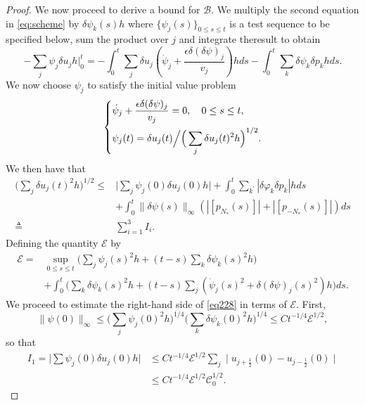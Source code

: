 \documentclass[10pt,a4paper]{amsart}
\begin{document}
\begin{proof}
We now proceed to derive a bound for $\mathscr{B}$. 
We multiply the second equation in \eqref{eq:scheme} by \(\delta\psi_{k}(s)h\)  where \(\{\psi_{j}(s)\}_{0\leq s\leq t}\) is a test sequence to be specified below, sum the product over \(j\) and integrate theresult to obtain
\[-\sum_{j}\psi_{j}\delta u_{j}h\Big|_{0}^t=-\int_{0}^{t}\sum_{j}\delta u_{j}\left(\dot{\psi}_{j}+\frac{\epsilon\delta(\delta\psi)_{j}}{v_{j}}\right)hds-\int_{0}^{t}\sum_{k}\delta\psi_{k}\delta p_{k}hds.\]
We now choose \(\psi_{j}\) to satisfy the initial value problem
\begin{equation}\label{back-para}
  \left\{\begin{aligned}
  \displaystyle  &\dot{\psi}_{j}+\frac{\epsilon\delta(\delta\psi)_{j}}{v_{j}}=0,\quad0\leq s\leq t,\\&\psi_{j}(t)=\delta u_{j}(t)\Big/\Big(\sum_{j}\delta u_{j}(t)^{2}h\Big)^{1/2}.
  \end{aligned}  \right.
\end{equation}
We then have that
\begin{equation}\label{eq228}
 \begin{aligned}
\Big(\sum_{j}\delta u_{j}(t)^{2}h\Big)^{1/2}\leq & \Big|\sum_{j}\psi_{j}(0)\delta u_{j}(0)h\Big|+\int_{0}^{t}\sum_{k^{\prime}}|\delta\varphi_{k}\delta p_{k}|hds \\&+\int_{0}^{t}\|\delta\psi(s)\|_{\infty}(|[p_{N_* }(s)]|+|[p_{- N_* }(s)]|)ds\\\triangleq &\sum_{i=1}^3I_i.
\end{aligned} 
\end{equation}
Defining the quantity $\mathscr{E}$ by
\[\begin{aligned}\label{eq229}
\mathscr{E}=& \sup_{0\leq s\leq t}\Big(\sum_{j}\psi_{j}(s)^{2}h+(t-s)\sum_{k}\delta\psi_{k}(s)^{2}h\Big)  \\
&+\int_{0}^{t}\Big(\sum\limits_{k}\delta\psi_{k}(s)^{2}h+(t-s)\sum_{j}(\dot{\psi}_{j}(s)^{2}+\delta(\delta\psi)_{j}(s)^{2})h\Big)ds.
\end{aligned}\]
We proceed to estimate the right-hand side of \eqref{eq228} in terms of $\mathscr{E}$. First,
\[\|\psi(0)\|_{\infty}\leq \Big(\sum_{j}\psi_{j}(0)^{2}h\Big)^{1/4}\Big(\sum_{k}\delta\psi_{k}(0)^{2}h\Big)^{1/4}\leq Ct^{-1/4}\mathscr{E}^{1/2},\]
so that
\[\begin{aligned}
I_1=\Big|\sum\psi_{j}(0)\delta u_{j}(0)h \Big|&\leq Ct^{-1/4}\mathscr{E}^{1/2}\sum_{j}\mid u_{j+\frac{1}{2}}(0)-u_{j-\frac{1}{2}}(0)\mid \\
&\leq Ct^{-1/4}\mathscr{E}^{1/2}\mathscr{C}_{0}^{1/2}. 

\end{aligned}\]
\end{proof}
\end{document}
